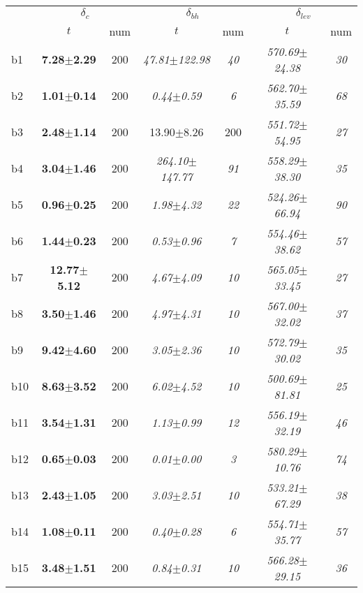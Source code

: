 \begin{longtable}{|l|c|c|c|c|c|c|}
\hline
&\multicolumn{2}{c|}{$\delta_c$}&\multicolumn{2}{c|}{$\delta_{bh}$}&\multicolumn{2}{c|}{$\delta_{lev}$}\\
\cline{2-7}
&$t$&num&$t$&num&$t$&num\\
\hline
b1&\textbf{7.28$\pm$2.29} & 200 &\textit{47.81$\pm$122.98} & \textit{40 }&\textit{570.69$\pm$24.38} & \textit{30 }
\\
b2&\textbf{1.01$\pm$0.14} & 200 &\textit{0.44$\pm$0.59} & \textit{6 }&\textit{562.70$\pm$35.59} & \textit{68 }
\\
b3&\textbf{2.48$\pm$1.14} & 200 &13.90$\pm$8.26 & 200 &\textit{551.72$\pm$54.95} & \textit{27 }
\\
b4&\textbf{3.04$\pm$1.46} & 200 &\textit{264.10$\pm$147.77} & \textit{91 }&\textit{558.29$\pm$38.30} & \textit{35 }
\\
b5&\textbf{0.96$\pm$0.25} & 200 &\textit{1.98$\pm$4.32} & \textit{22 }&\textit{524.26$\pm$66.94} & \textit{90 }
\\
b6&\textbf{1.44$\pm$0.23} & 200 &\textit{0.53$\pm$0.96} & \textit{7 }&\textit{554.46$\pm$38.62} & \textit{57 }
\\
b7&\textbf{12.77$\pm$5.12} & 200 &\textit{4.67$\pm$4.09} & \textit{10 }&\textit{565.05$\pm$33.45} & \textit{27 }
\\
b8&\textbf{3.50$\pm$1.46} & 200 &\textit{4.97$\pm$4.31} & \textit{10 }&\textit{567.00$\pm$32.02} & \textit{37 }
\\
b9&\textbf{9.42$\pm$4.60} & 200 &\textit{3.05$\pm$2.36} & \textit{10 }&\textit{572.79$\pm$30.02} & \textit{35 }
\\
b10&\textbf{8.63$\pm$3.52} & 200 &\textit{6.02$\pm$4.52} & \textit{10 }&\textit{500.69$\pm$81.81} & \textit{25 }
\\
b11&\textbf{3.54$\pm$1.31} & 200 &\textit{1.13$\pm$0.99} & \textit{12 }&\textit{556.19$\pm$32.19} & \textit{46 }
\\
b12&\textbf{0.65$\pm$0.03} & 200 &\textit{0.01$\pm$0.00} & \textit{3 }&\textit{580.29$\pm$10.76} & \textit{74 }
\\
b13&\textbf{2.43$\pm$1.05} & 200 &\textit{3.03$\pm$2.51} & \textit{10 }&\textit{533.21$\pm$67.29} & \textit{38 }
\\
b14&\textbf{1.08$\pm$0.11} & 200 &\textit{0.40$\pm$0.28} & \textit{6 }&\textit{554.71$\pm$35.77} & \textit{57 }
\\
b15&\textbf{3.48$\pm$1.51} & 200 &\textit{0.84$\pm$0.31} & \textit{10 }&\textit{566.28$\pm$29.15} & \textit{36 }
\\

\end{longtable}
